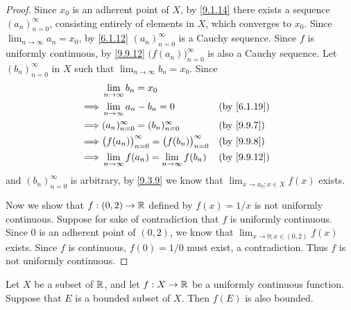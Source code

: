 \begin{proof}
  Since \(x_0\) is an adherent point of \(X\), by \cref{9.1.14} there exists a sequence \((a_n)_{n = 0}^\infty\), consisting entirely of elements in \(X\), which converges to \(x_0\).
  Since \(\lim_{n \to \infty} a_n = x_0\), by \cref{6.1.12} \((a_n)_{n = 0}^\infty\) is a Cauchy sequence.
  Since \(f\) is uniformly continuous, by \cref{9.9.12} \(\big(f(a_n)\big)_{n = 0}^\infty\) is also a Cauchy sequence.
  Let \((b_n)_{n = 0}^\infty\) in \(X\) such that \(\lim_{n \to \infty} b_n = x_0\).
  Since
  \begin{align*}
             & \lim_{n \to \infty} b_n = x_0                                                      \\
    \implies & \lim_{n \to \infty} a_n - b_n = 0                                 &  & \by{6.1.19} \\
    \implies & (a_n)_{n = 0}^\infty = (b_n)_{n = 0}^\infty                       &  & \by{9.9.7}  \\
    \implies & \big(f(a_n)\big)_{n = 0}^\infty = \big(f(b_n)\big)_{n = 0}^\infty &  & \by{9.9.8}  \\
    \implies & \lim_{n \to \infty} f(a_n) = \lim_{n \to \infty} f(b_n)           &  & \by{9.9.12}
  \end{align*}
  and \((b_n)_{n = 0}^\infty\) is arbitrary, by \cref{9.3.9} we know that \(\lim_{x \to x_0 ; x \in X} f(x)\) exists.

  Now we show that \(f : (0, 2) \to \mathbb{R}\) defined by \(f(x) = 1 / x\) is not uniformly continuous.
  Suppose for sake of contradiction that \(f\) is uniformly continuous.
  Since \(0\) is an adherent point of \((0, 2)\), we know that \(\lim_{x \to 0 ; x \in (0, 2)} f(x)\) exists.
  Since \(f\) is continuous, \(f(0) = 1 / 0\) must exist, a contradiction.
  Thus \(f\) is not uniformly continuous.
\end{proof}

\begin{prop}\label{9.9.15}
  Let \(X\) be a subset of \(\mathbb{R}\), and let \(f : X \to \mathbb{R}\) be a uniformly continuous function.
  Suppose that \(E\) is a bounded subset of \(X\).
  Then \(f(E)\) is also bounded.
\end{prop}

